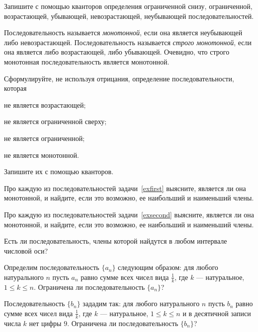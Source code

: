 \documentclass[a4paper, 12pt, num=24]{listok}
\begin{document}
\begin{problem}
    Запишите с помощью кванторов определения ограниченной снизу, ограниченной, возрастающей, убывающей, невозрастающей, неубывающей последовательностей.
\end{problem}
\begin{definition}
    Последовательность называется \textit{монотонной}, если она является неубывающей либо невозрастающей.
    Последовательность называется \textit{строго монотонной}, если она является либо возрастающей, либо убывающей.
    Очевидно, что строго монотонная последовательность является монотонной.
\end{definition}
\begin{problem}
    Сформулируйте, не используя отрицания, определение последовательности, которая
    \begin{probparts}
        \item не является возрастающей;
        \item не является ограниченной сверху;
        \item не является ограниченной;
        \item не является монотонной.
    \end{probparts}
    Запишите их с помощью кванторов.
\end{problem}
\begin{problem}
    Про каждую из последовательностей задачи~\ref{exfirst} выясните, является ли она монотонной, и найдите, если это возможно, ее наибольший и наименьший члены.
\end{problem}
\begin{problem}
    Про каждую из последовательностей задачи~\ref{exsecond} выясните, является ли она монотонной, и найдите, если это возможно, ее наибольший и наименьший члены.
\end{problem}
\begin{problem}
    Есть ли последовательность, члены которой найдутся в любом интервале числовой оси?
\end{problem}
\begin{problem}
\begin{probparts}
    \item Определим последовательность $\{a_n\}$ следующим образом:
    для любого натурального $n$ пусть $a_n$ равно сумме всех чисел вида $\frac1k$, где $k$ --- натуральное, $1 \le k \le n$.
    Ограничена ли последовательность $\{a_n\}$?
    \item Последовательность $\{b_n\}$ зададим так: для любого натурального $n$ пусть $b_n$ равно сумме всех чисел вида $\frac1k$,
    где $k$ --- натуральное, $1 \le k \le n$ и в десятичной записи числа $k$ нет цифры $9$. Ограничена ли последовательность $\{b_n\}$?
\end{probparts}
\end{problem}
\end{document}
